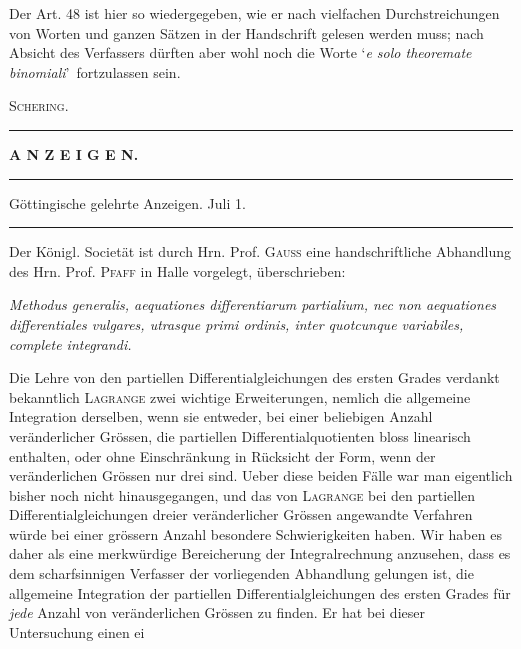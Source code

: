 Der Art. 48 ist hier so wiedergegeben, wie er nach vielfachen Durchstreichungen von Worten und ganzen Sätzen in der Handschrift gelesen werden muss; nach Absicht des Verfassers dürften aber wohl noch die Worte \lq\textit{e solo theoremate binomiali}\rq\ fortzulassen sein.
\begin{flushright}\textsc{Schering.}\end{flushright}
\begin{center}\rule{.4\linewidth}{.4pt}\end{center}
\clearpage{}
\begin{center}\textbf{A N Z E I G E N.}\par\bigskip
\rule{.85\linewidth}{.4pt}\par
Göttingische gelehrte Anzeigen. Juli 1.\par
\rule{.85\linewidth}{.4pt}\end{center}
Der Königl. Societät ist durch Hrn. Prof. \textsc{Gauss} eine handschriftliche Abhandlung des Hrn. Prof. \textsc{Pfaff} in Halle vorgelegt, überschrieben:
\begin{center}\textit{Methodus generalis, aequationes differentiarum partialium, nec non aequationes differentiales vulgares, utrasque primi ordinis, inter quotcunque variabiles, complete integrandi.}\end{center}
Die Lehre von den partiellen Differentialgleichungen des ersten Grades verdankt bekanntlich \textsc{Lagrange} zwei wichtige Erweiterungen, nemlich die allgemeine Integration derselben, wenn sie entweder, bei einer beliebigen Anzahl veränderlicher Grössen, die partiellen Differentialquotienten bloss linearisch enthalten, oder ohne Einschränkung in Rücksicht der Form, wenn der veränderlichen Grössen nur drei sind. Ueber diese beiden Fälle war man eigentlich bisher noch nicht hinausgegangen, und das von \textsc{Lagrange} bei den partiellen Differentialgleichungen dreier veränderlicher Grössen angewandte Verfahren würde bei einer grössern Anzahl besondere Schwierigkeiten haben. Wir haben es daher als eine merkwürdige Bereicherung der Integralrechnung anzusehen, dass es dem scharfsinnigen Verfasser der vorliegenden Abhandlung gelungen ist, die allgemeine Integration der partiellen Differentialgleichungen des ersten Grades für \textit{jede} Anzahl von veränderlichen Grössen zu finden. Er hat bei dieser Untersuchung einen ei%
